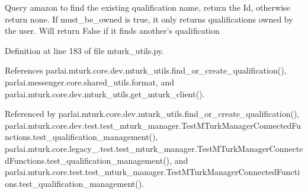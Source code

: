 \begin{DoxyVerb}Query amazon to find the existing qualification name, return the Id,
otherwise return none.
If must_be_owned is true, it only returns qualifications owned by the user.
Will return False if it finds another's qualification
\end{DoxyVerb}
 

Definition at line 183 of file mturk\+\_\+utils.\+py.



References parlai.\+mturk.\+core.\+dev.\+mturk\+\_\+utils.\+find\+\_\+or\+\_\+create\+\_\+qualification(), parlai.\+messenger.\+core.\+shared\+\_\+utils.\+format, and parlai.\+mturk.\+core.\+dev.\+mturk\+\_\+utils.\+get\+\_\+mturk\+\_\+client().



Referenced by parlai.\+mturk.\+core.\+dev.\+mturk\+\_\+utils.\+find\+\_\+or\+\_\+create\+\_\+qualification(), parlai.\+mturk.\+core.\+dev.\+test.\+test\+\_\+mturk\+\_\+manager.\+Test\+M\+Turk\+Manager\+Connected\+Functions.\+test\+\_\+qualification\+\_\+management(), parlai.\+mturk.\+core.\+legacy\+\_.\+test.\+test\+\_\+mturk\+\_\+manager.\+Test\+M\+Turk\+Manager\+Connected\+Functions.\+test\+\_\+qualification\+\_\+management(), and parlai.\+mturk.\+core.\+test.\+test\+\_\+mturk\+\_\+manager.\+Test\+M\+Turk\+Manager\+Connected\+Functions.\+test\+\_\+qualification\+\_\+management().


